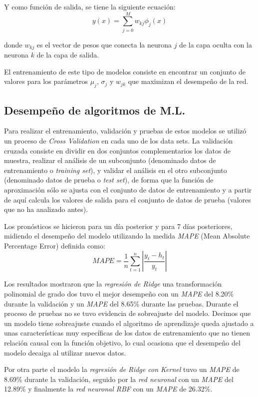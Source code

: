 {Y como función de salida, se tiene la siguiente ecuación: $$y(x)=\sum_{j=0}^{M} w_{kj} \phi_j(x)$$

donde $w_{kj}$ es el vector de pesos que conecta la neurona $j$ de la capa oculta con la neurona $k$ de la capa de salida.

El entrenamiento de este tipo de modelos consiste en encontrar un conjunto de valores para los parámetros $\mu_j$, $\sigma_j$ y $w_{jk}$ que maximizan el desempeño de la red. 

\subsection*{Desempeño de algoritmos de M.L.}

Para realizar el entrenamiento, validación y pruebas de estos modelos se utilizó un proceso de \emph{Cross Validation} en cada uno de los data sets.  La validación cruzada consiste en dividir en dos conjuntos complementarios los datos de muestra, realizar el análisis de un subconjunto (denominado datos de entrenamiento o \emph{training set}), y validar el análisis en el otro subconjunto (denominado datos de prueba o \emph{test set}), de forma que la función de aproximación sólo se ajusta con el conjunto de datos de entrenamiento y a partir de aquí calcula los valores de salida para el conjunto de datos de prueba (valores que no ha analizado antes).

Los pronósticos se hicieron para un día posterior y para 7 días posteriores, midiendo el desempeño del modelo utilizando la medida \emph{MAPE} (Mean Absolute Percentage Error) definida como: $$MAPE=\frac{1}{n}\sum_{t=1}^{n}|\frac{y_t-h_t}{y_t}|$$

Los resultados mostraron que la \emph{regresión de Ridge} una transformación polinomial de grado dos tuvo el mejor desempeño con un \emph{MAPE} del 8.20\% durante la validación y un \emph{MAPE} del 8.65\% durante las pruebas. Durante el proceso de pruebas no se tuvo evidencia de sobreajuste del modelo. Decimos que un modelo tiene sobreajuste cuando el algoritmo de aprendizaje queda ajustado a unas características muy específicas de los datos de entrenamiento que no tienen relación causal con la función objetivo, lo cual ocasiona que el desempeño del modelo decaiga al utilizar nuevos datos.

Por otra parte el modelo la \emph{regresión de Ridge con Kernel} tuvo un \emph{MAPE} de 8.69\% durante la validación, seguido por la \emph{red neuronal} con un \emph{MAPE} del 12.89\% y finalmente la \emph{red neuronal RBF} con un \emph{MAPE} de 26.32\%.

}
